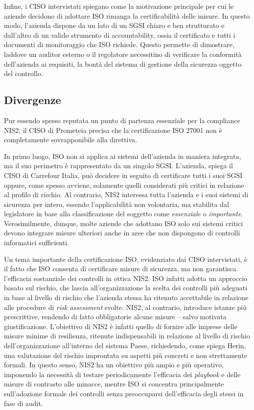 Infine, i CISO intervistati spiegano come la motivazione principale per cui le aziende decidono di adottare ISO rimanga la certificabilità
delle misure. In questo modo, l'azienda dispone da un lato di un SGSI chiaro e ben strutturato e 
dall'altro di un valido strumento di accountability, ossia il certificato e tutti i documenti di monitoraggio
che ISO richiede. Questo permette di dimostrare, laddove un auditor esterno o il regolatore necessitino di verificare la conformità
dell'azienda ai requisiti, la bontà del sistema di gestione della sicurezza oggetto del controllo.


\subsection{Divergenze}
Pur essendo spesso reputata un punto di partenza essenziale per la compliance NIS2, il CISO di Prometeia precisa che 
la certificazione ISO 27001 non è completamente sovrapponibile alla direttiva.

In primo luogo, ISO non si applica ai sistemi dell'azienda in maniera integrata, ma il suo perimetro
è rappresentato da un singolo SGSI. L'azienda, spiega il CISO di Carrefour Italia, può decidere in seguito di certificare tutti i suoi SGSI oppure,
come spesso avviene, solamente quelli considerati più critici in relazione al profilo di rischio.
Al contrario, NIS2 interessa tutta l'azienda e i suoi sistemi di sicurezza per intero, essendo l'applicabilità
non volontaria, ma stabilita dal legislatore in base alla classificazione del soggetto come
\textit{essenziale} o \textit{importante}. Verosimilmente, dunque, molte aziende che adottano
ISO solo sui sistemi critici devono integrare misure ulteriori anche in aree che non dispongono di controlli informatici sufficienti.

Un tema importante della certificazione ISO, evidenziato dai CISO intervistati, è il fatto che ISO consenta di certificare misure di sicurezza, ma non 
garantisca l’efficacia sostanziale dei controlli in ottica NIS2.
ISO infatti adotta un approccio basato sul rischio, che lascia all’organizzazione la scelta dei controlli più adeguati in base al livello di rischio 
che l'azienda stessa ha ritenuto accettabile in relazione alle procedure di \textit{risk assessment} svolte. 
NIS2, al contrario, introduce istanze più prescrittive, rendendo di fatto obbligatorie alcune misure -- salvo motivata giustificazione. 
L'obiettivo di NIS2 è infatti quello di fornire alle imprese delle misure minime di resilienza,
ritenute indispensabili in relazione al livello di rischio dell'organizzazione all'interno 
del sistema Paese, richiedendo, come spiega Herin, una valutazione del rischio improntata su aspetti più concreti e non strettamente formali.
In questo senso, NIS2 ha un obiettivo più ampio e più operativo, imponendo la necessità di testare periodicamente
l'efficacia dei \textit{playbook} e delle misure di contrasto alle minacce, mentre ISO si concentra principalmente
sull'adozione formale dei controlli senza preoccuparsi dell'efficacia degli stessi in fase di audit.


